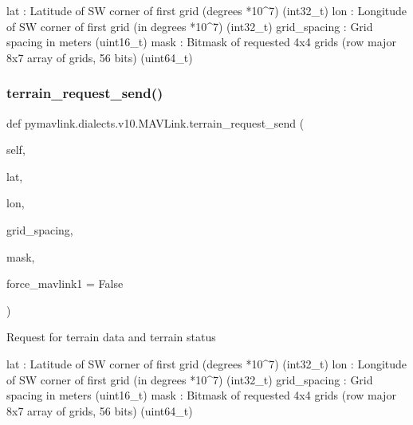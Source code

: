 \begin{DoxyVerb}
\begin{DoxyVerb}
\begin{DoxyVerb}
\begin{DoxyVerb}
\begin{DoxyVerb}
\begin{DoxyVerb}
\begin{DoxyVerb}
\begin{DoxyVerb}
\begin{DoxyVerb}
\begin{DoxyVerb}
\begin{DoxyVerb}
lat                       : Latitude of SW corner of first grid (degrees *10^7) (int32_t)
lon                       : Longitude of SW corner of first grid (in degrees *10^7) (int32_t)
grid_spacing              : Grid spacing in meters (uint16_t)
mask                      : Bitmask of requested 4x4 grids (row major 8x7 array of grids, 56 bits) (uint64_t)\end{DoxyVerb}
 \mbox{\label{classpymavlink_1_1dialects_1_1v10_1_1MAVLink_a422b8160f09acfac224af58739ea1f11}} 
\subsubsection{\texorpdfstring{terrain\+\_\+request\+\_\+send()}{terrain\_request\_send()}}
{\footnotesize\ttfamily def pymavlink.\+dialects.\+v10.\+M\+A\+V\+Link.\+terrain\+\_\+request\+\_\+send (\begin{DoxyParamCaption}\item[{}]{self,  }\item[{}]{lat,  }\item[{}]{lon,  }\item[{}]{grid\+\_\+spacing,  }\item[{}]{mask,  }\item[{}]{force\+\_\+mavlink1 = {\ttfamily False} }\end{DoxyParamCaption})}

\begin{DoxyVerb}Request for terrain data and terrain status

lat                       : Latitude of SW corner of first grid (degrees *10^7) (int32_t)
lon                       : Longitude of SW corner of first grid (in degrees *10^7) (int32_t)
grid_spacing              : Grid spacing in meters (uint16_t)
mask                      : Bitmask of requested 4x4 grids (row major 8x7 array of grids, 56 bits) (uint64_t)\end{DoxyVerb}
 \mbox{\label{classpymavlink_1_1dialects_1_1v10_1_1MAVLink_ae37c8b3245225c68b6bcdf02ed0a0fdd}} 

\end{DoxyVerb}
\end{DoxyVerb}
\end{DoxyVerb}
\end{DoxyVerb}
\end{DoxyVerb}
\end{DoxyVerb}
\end{DoxyVerb}
\end{DoxyVerb}
\end{DoxyVerb}
\end{DoxyVerb}
